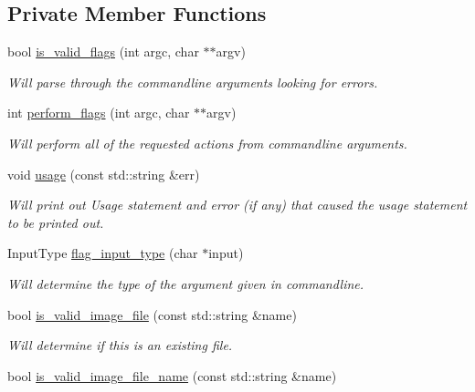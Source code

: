 \subsection*{Private Member Functions}
\begin{DoxyCompactItemize}
\item 
bool \hyperlink{classimage__tools_1_1MIACommandlineManager_aac75fffa612779a332de31e4cfe8d4fc}{is\+\_\+valid\+\_\+flags} (int argc, char $\ast$$\ast$argv)
\begin{DoxyCompactList}\small\item\em Will parse through the commandline arguments looking for errors. \end{DoxyCompactList}\item 
int \hyperlink{classimage__tools_1_1MIACommandlineManager_aae4bae8a16d283fdc81a50f7bf9fb415}{perform\+\_\+flags} (int argc, char $\ast$$\ast$argv)
\begin{DoxyCompactList}\small\item\em Will perform all of the requested actions from commandline arguments. \end{DoxyCompactList}\item 
void \hyperlink{classimage__tools_1_1MIACommandlineManager_a6dfb9e4962301d2860e7e5d878c85e83}{usage} (const std\+::string \&err)
\begin{DoxyCompactList}\small\item\em Will print out Usage statement and error (if any) that caused the usage statement to be printed out. \end{DoxyCompactList}\item 
Input\+Type \hyperlink{classimage__tools_1_1MIACommandlineManager_a3a39d94de32b536aa59d52311e7db427}{flag\+\_\+input\+\_\+type} (char $\ast$input)
\begin{DoxyCompactList}\small\item\em Will determine the type of the argument given in commandline. \end{DoxyCompactList}\item 
bool \hyperlink{classimage__tools_1_1MIACommandlineManager_ab9049b7cd3d1e80d83a08908c078b2c5}{is\+\_\+valid\+\_\+image\+\_\+file} (const std\+::string \&name)
\begin{DoxyCompactList}\small\item\em Will determine if this is an existing file. \end{DoxyCompactList}\item 
bool \hyperlink{classimage__tools_1_1MIACommandlineManager_a25c93b7f74b68fb88586065d7ea3dffe}{is\+\_\+valid\+\_\+image\+\_\+file\+\_\+name} (const std\+::string \&name)

\end{DoxyCompactItemize}
